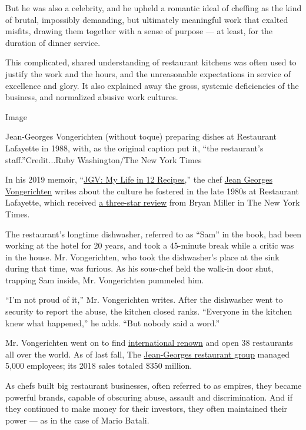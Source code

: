 But he was also a celebrity, and he upheld a romantic ideal of cheffing
as the kind of brutal, impossibly demanding, but ultimately meaningful
work that exalted misfits, drawing them together with a sense of purpose
--- at least, for the duration of dinner service.

This complicated, shared understanding of restaurant kitchens was often
used to justify the work and the hours, and the unreasonable
expectations in service of excellence and glory. It also explained away
the gross, systemic deficiencies of the business, and normalized abusive
work cultures.

Image

Jean-Georges Vongerichten (without toque) preparing dishes at Restaurant
Lafayette in 1988, with, as the original caption put it, ``the
restaurant's staff.''Credit...Ruby Washington/The New York Times

In his 2019 memoir,
``\href{https://wwnorton.com/books/9780393608489}{JGV: My Life in 12
Recipes},'' the chef
\href{https://www.nytimes.com/2020/01/14/dining/jean-georges-vongerichten.html}{Jean
Georges Vongerichten} writes about the culture he fostered in the late
1980s at Restaurant Lafayette, which received
\href{https://www.nytimes.com/1988/04/22/arts/restaurants-067888.html}{a
three-star review} from Bryan Miller in The New York Times.

The restaurant's longtime dishwasher, referred to as ``Sam'' in the
book, had been working at the hotel for 20 years, and took a 45-minute
break while a critic was in the house. Mr. Vongerichten, who took the
dishwasher's place at the sink during that time, was furious. As his
sous-chef held the walk-in door shut, trapping Sam inside, Mr.
Vongerichten pummeled him.

``I'm not proud of it,'' Mr. Vongerichten writes. After the dishwasher
went to security to report the abuse, the kitchen closed ranks.
``Everyone in the kitchen knew what happened,'' he adds. ``But nobody
said a word.''

Mr. Vongerichten went on to find
\href{https://www.nytimes.com/2019/10/17/magazine/jean-georges-restaurants.html}{international
renown} and open 38 restaurants all over the world. As of last fall, The
\href{https://www.jean-georges.com/restaurants/united-states}{Jean-Georges
restaurant group} managed 5,000 employees; its 2018 sales totaled \$350
million.

As chefs built big restaurant businesses, often referred to as empires,
they became powerful brands, capable of obscuring abuse, assault and
discrimination. And if they continued to make money for their investors,
they often maintained their power --- as in the case of Mario Batali.

